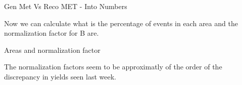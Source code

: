 \documentclass[8pt]{beamer}
\begin{document}
\begin{frame}{Gen Met Vs Reco MET - Into Numbers}

Now we can calculate what is the percentage of events in each area and the normalization factor for B are.

\begin{block}{Areas and normalization factor}

\begin{table}[!h]
\centering
\resizebox{\linewidth}{!}{}
\caption{Relative are for A, B, C and D areas and factor to normalize B area to A+B (normalize QCD VBF samples to inclusive at $MET>130$ $GeV$ cut.}
\end{table}

\end{block}

The normalization factors seem to be approximatly of the order of the discrepancy in yields seen last week.

\end{frame}
\end{document}
